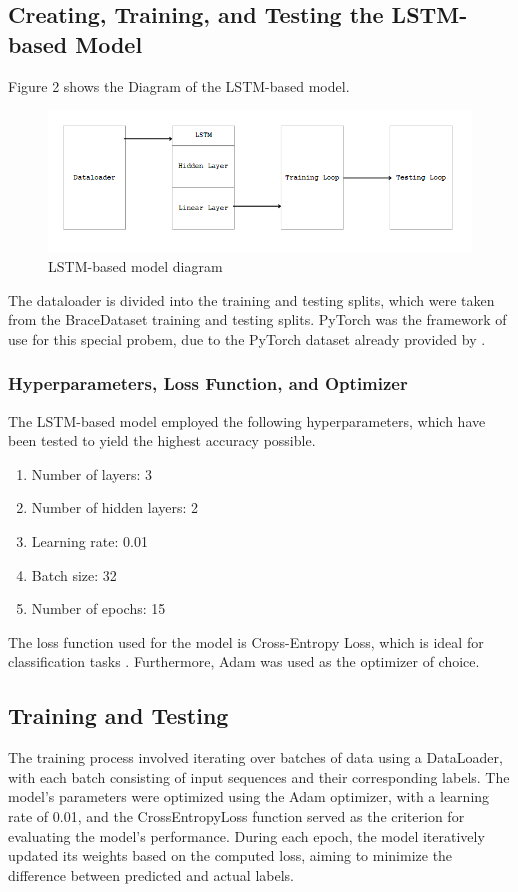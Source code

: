 \documentclass[12pt]{article}
\begin{document}
\subsection{Creating, Training, and Testing the LSTM-based Model}
\par Figure 2 shows the Diagram of the LSTM-based model. 
\begin{figure}[htbp]
    \includegraphics[width=\linewidth]{lstm flow.png}
    \caption{LSTM-based model diagram}
    \label{fig:2}
\end{figure}
\par The dataloader is divided into the training and testing splits, which were taken from the BraceDataset training and testing splits. PyTorch was the framework of use for this special probem, due to the PyTorch dataset already provided by \Textcite{brace}. 

\subsubsection{Hyperparameters, Loss Function, and Optimizer}
    \par The LSTM-based model employed the following hyperparameters, which have been tested to yield the highest accuracy possible.

    \begin{enumerate}
        \item Number of layers: 3
        \item Number of hidden layers: 2
        \item Learning rate: 0.01
        \item Batch size: 32
        \item Number of epochs: 15
    \end{enumerate}

    \par The loss function used for the model is Cross-Entropy Loss, which is ideal for classification tasks \parencite{CrossEntropy}. Furthermore, Adam was used as the optimizer of choice.

\subsection{Training and Testing}
\par The training process involved iterating over batches of data using a DataLoader, with each batch consisting of input sequences and their corresponding labels. The model's parameters were optimized using the Adam optimizer, with a learning rate of 0.01, and the CrossEntropyLoss function served as the criterion for evaluating the model's performance. During each epoch, the model iteratively updated its weights based on the computed loss, aiming to minimize the difference between predicted and actual labels.
\end{document}
